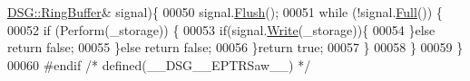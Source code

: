 \begin{DoxyCode}
      \hyperlink{class_d_s_g_1_1_ring_buffer}{DSG::RingBuffer}& signal)\{
00050             signal.\hyperlink{class_d_s_g_1_1_ring_buffer_ab23c8003d2857809a816068eeb209d60}{Flush}();
00051             \textcolor{keywordflow}{while} (!signal.\hyperlink{class_d_s_g_1_1_ring_buffer_a53ddb04ffcbb5470a8d2b0a3c65b70cb}{Full}()) \{
00052                 \textcolor{keywordflow}{if} (Perform(\_storage)) \{
00053                     \textcolor{keywordflow}{if}(signal.\hyperlink{class_d_s_g_1_1_ring_buffer_aa5dd2caa0a270173251faee40a43d692}{Write}(\_storage))\{
00054                     \}\textcolor{keywordflow}{else} \textcolor{keywordflow}{return} \textcolor{keyword}{false};
00055                 \}\textcolor{keywordflow}{else} \textcolor{keywordflow}{return} \textcolor{keyword}{false};
00056             \}\textcolor{keywordflow}{return} \textcolor{keyword}{true};
00057         \}
00058     \}
00059 \}
00060 \textcolor{preprocessor}{#endif }\textcolor{comment}{/* defined(\_\_DSG\_\_EPTRSaw\_\_) */}\textcolor{preprocessor}{}
\end{DoxyCode}
